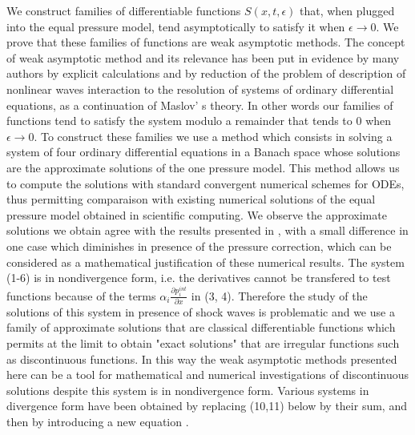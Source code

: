 \documentclass[a4paper,12pt]{article}
\begin{document}
We construct families of differentiable functions $S(x,t,\epsilon)$ that, when plugged into the equal pressure model, tend asymptotically to satisfy it when $\epsilon\rightarrow 0$. We prove that these families of functions are weak asymptotic methods. The concept of weak asymptotic method and its relevance has been put in evidence by many authors \cite{Albeverio, Danilov1, Mitrovic, Panov, Shelkovichmat} by explicit calculations and by reduction of the problem of description of nonlinear waves interaction to the resolution of systems of  ordinary differential equations, as a continuation of Maslov' s theory. In other words our families of functions tend to satisfy the system modulo a remainder that tends to 0 when  $\epsilon\rightarrow 0$. To construct these families we use a method which consists in solving a system of four ordinary differential equations in a Banach space whose solutions are the approximate solutions of the one pressure model. This method allows us to compute the solutions with standard convergent numerical schemes for ODEs, thus permitting comparaison with existing numerical solutions of the equal pressure model obtained in scientific computing.  We observe the approximate solutions we obtain agree with the results  presented in \cite{EvjeFlatten}, with a small difference in one case which diminishes in presence of the pressure correction, which can be considered as a mathematical justification of these numerical results. The system (1-6) is in nondivergence form, i.e. the derivatives cannot be transfered to test functions because of the terms $\alpha_i\frac{\partial p_i^{int}}{\partial x} $ in (3, 4). Therefore the study of the solutions of this system in presence of shock waves is  problematic and we use a family of approximate solutions that are classical differentiable functions which permits at the limit to obtain "exact solutions" that are irregular functions such as discontinuous functions. In this way the weak asymptotic methods presented here can be a tool for mathematical and numerical investigations of discontinuous solutions despite this system is in nondivergence form. Various systems in divergence form have been obtained by replacing (10,11) below by their sum, and then by introducing a new equation \cite{Evje1, Evje2, Evje3, EvjeFlattenFriis, EvjeFriis, EvjeKarlsen1, EvjeKarlsen2}.\\ 
\end{document}
